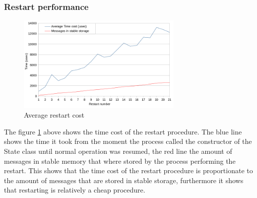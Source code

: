 \documentclass[twocolumn, a4paper,11pt]{article}%
\begin{document}
\subsubsection{Restart performance}
\begin{figure}[h]
	\includegraphics[width=8cm]{restart_timing_average_rode_lijn_new.png}
	\caption{Average restart cost}
	\label{fig:average_restart}
\end{figure}\noindent
The figure \ref{fig:average_restart} above shows the time cost of the restart procedure. The blue line shows the time it took from the moment the process called the constructor of the State class until normal operation was resumed, the red line the amount of messages in stable memory that where stored by the process performing the restart. This shows that the time cost of the restart procedure is proportionate to the amount of messages that are stored in stable storage, furthermore it shows that restarting is relatively a cheap procedure. 
\end{document}
